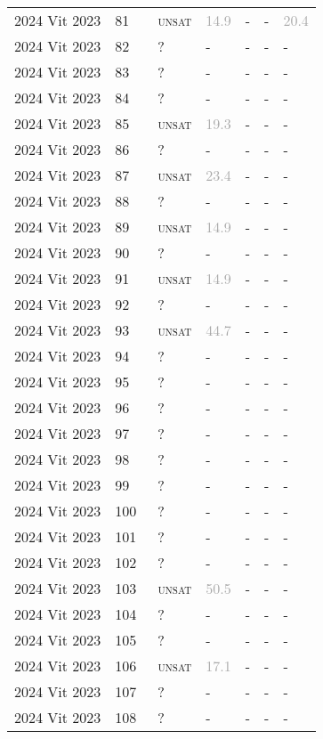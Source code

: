 \begin{center}
{\begin{longtable}{@{}lllllll@{}}
2024 Vit 2023 & 81 & ~\textsc{unsat} & \textcolor{darkgray}{14.9} & - & - & \textcolor{darkgray}{20.4} \\
2024 Vit 2023 & 82 & ~? & - & - & - & - \\
2024 Vit 2023 & 83 & ~? & - & - & - & - \\
2024 Vit 2023 & 84 & ~? & - & - & - & - \\
2024 Vit 2023 & 85 & ~\textsc{unsat} & \textcolor{darkgray}{19.3} & - & - & - \\
2024 Vit 2023 & 86 & ~? & - & - & - & - \\
2024 Vit 2023 & 87 & ~\textsc{unsat} & \textcolor{darkgray}{23.4} & - & - & - \\
2024 Vit 2023 & 88 & ~? & - & - & - & - \\
2024 Vit 2023 & 89 & ~\textsc{unsat} & \textcolor{darkgray}{14.9} & - & - & - \\
2024 Vit 2023 & 90 & ~? & - & - & - & - \\
2024 Vit 2023 & 91 & ~\textsc{unsat} & \textcolor{darkgray}{14.9} & - & - & - \\
2024 Vit 2023 & 92 & ~? & - & - & - & - \\
2024 Vit 2023 & 93 & ~\textsc{unsat} & \textcolor{darkgray}{44.7} & - & - & - \\
2024 Vit 2023 & 94 & ~? & - & - & - & - \\
2024 Vit 2023 & 95 & ~? & - & - & - & - \\
2024 Vit 2023 & 96 & ~? & - & - & - & - \\
2024 Vit 2023 & 97 & ~? & - & - & - & - \\
2024 Vit 2023 & 98 & ~? & - & - & - & - \\
2024 Vit 2023 & 99 & ~? & - & - & - & - \\
2024 Vit 2023 & 100 & ~? & - & - & - & - \\
2024 Vit 2023 & 101 & ~? & - & - & - & - \\
2024 Vit 2023 & 102 & ~? & - & - & - & - \\
2024 Vit 2023 & 103 & ~\textsc{unsat} & \textcolor{darkgray}{50.5} & - & - & - \\
2024 Vit 2023 & 104 & ~? & - & - & - & - \\
2024 Vit 2023 & 105 & ~? & - & - & - & - \\
2024 Vit 2023 & 106 & ~\textsc{unsat} & \textcolor{darkgray}{17.1} & - & - & - \\
2024 Vit 2023 & 107 & ~? & - & - & - & - \\
2024 Vit 2023 & 108 & ~? & - & - & - & - \\

\end{longtable}}
\end{center}
